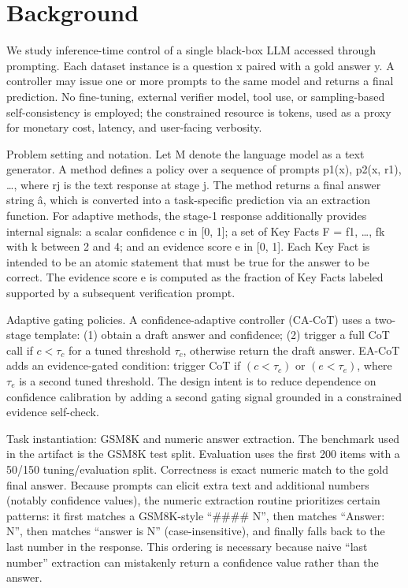 \documentclass[journal,article,submit,pdftex,moreauthors]{Definitions/mdpi}
\begin{document}
\section{Background}

We study inference-time control of a single black-box LLM accessed through prompting. Each dataset instance is a question x paired with a gold answer y. A controller may issue one or more prompts to the same model and returns a final prediction. No fine-tuning, external verifier model, tool use, or sampling-based self-consistency is employed; the constrained resource is tokens, used as a proxy for monetary cost, latency, and user-facing verbosity.

Problem setting and notation. Let M denote the language model as a text generator. A method defines a policy over a sequence of prompts p1(x), p2(x, r1), …, where rj is the text response at stage j. The method returns a final answer string â, which is converted into a task-specific prediction via an extraction function. For adaptive methods, the stage-1 response additionally provides internal signals: a scalar confidence c in [0, 1]; a set of Key Facts F = {f1, …, fk} with k between 2 and 4; and an evidence score e in [0, 1]. Each Key Fact is intended to be an atomic statement that must be true for the answer to be correct. The evidence score e is computed as the fraction of Key Facts labeled supported by a subsequent verification prompt.

Adaptive gating policies. A confidence-adaptive controller (CA-CoT) uses a two-stage template: (1) obtain a draft answer and confidence; (2) trigger a full CoT call if $c < \tau_c$ for a tuned threshold $\tau_c$, otherwise return the draft answer. EA-CoT adds an evidence-gated condition: trigger CoT if $(c < \tau_c)$ or $(e < \tau_e)$, where $\tau_e$ is a second tuned threshold. The design intent is to reduce dependence on confidence calibration by adding a second gating signal grounded in a constrained evidence self-check.

Task instantiation: GSM8K and numeric answer extraction. The benchmark used in the artifact is the GSM8K test split. Evaluation uses the first 200 items with a 50/150 tuning/evaluation split. Correctness is exact numeric match to the gold final answer. Because prompts can elicit extra text and additional numbers (notably confidence values), the numeric extraction routine prioritizes certain patterns: it first matches a GSM8K-style “#### N”, then matches “Answer: N”, then matches “answer is N” (case-insensitive), and finally falls back to the last number in the response. This ordering is necessary because naive “last number” extraction can mistakenly return a confidence value rather than the answer.
\end{document}
